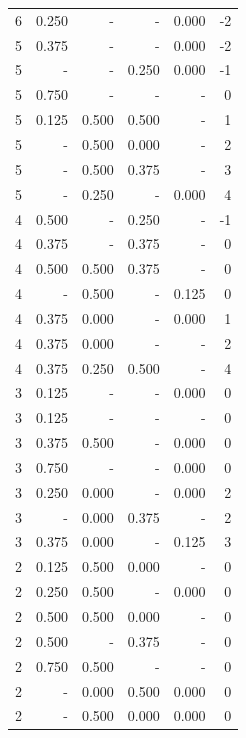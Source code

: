\documentclass[a4paper]{article}\usepackage{graphicx, color}
\begin{document}
\begin{table}[ht]
\begin{tabular}{rrrrrr}
   \rowcolor{nullColor} 6 & 0.250 & - & - & 0.000 & -2 \\ 
   \rowcolor{nullColor} 5 & 0.375 & - & - & 0.000 & -2 \\ 
   \rowcolor{sosoColor} 5 & - & - & 0.250 & 0.000 & -1 \\ 
   \rowcolor{nullColor} 5 & 0.750 & - & - & - & 0 \\ 
   \rowcolor{goodColor} 5 & 0.125 & 0.500 & 0.500 & - & 1 \\ 
   \rowcolor{badColor} 5 & - & 0.500 & 0.000 & - & 2 \\ 
  5 & - & 0.500 & 0.375 & - & 3 \\ 
  5 & - & 0.250 & - & 0.000 & 4 \\ 
   \rowcolor{sosoColor} 4 & 0.500 & - & 0.250 & - & -1 \\ 
   \rowcolor{sosoColor} 4 & 0.375 & - & 0.375 & - & 0 \\ 
  4 & 0.500 & 0.500 & 0.375 & - & 0 \\ 
  4 & - & 0.500 & - & 0.125 & 0 \\ 
  4 & 0.375 & 0.000 & - & 0.000 & 1 \\ 
  4 & 0.375 & 0.000 & - & - & 2 \\ 
   \rowcolor{badColor} 4 & 0.375 & 0.250 & 0.500 & - & 4 \\ 
   \rowcolor{nullColor} 3 & 0.125 & - & - & 0.000 & 0 \\ 
   \rowcolor{nullColor} 3 & 0.125 & - & - & - & 0 \\ 
  3 & 0.375 & 0.500 & - & 0.000 & 0 \\ 
   \rowcolor{nullColor} 3 & 0.750 & - & - & 0.000 & 0 \\ 
  3 & 0.250 & 0.000 & - & 0.000 & 2 \\ 
   \rowcolor{badColor} 3 & - & 0.000 & 0.375 & - & 2 \\ 
  3 & 0.375 & 0.000 & - & 0.125 & 3 \\ 
   \rowcolor{badColor} 2 & 0.125 & 0.500 & 0.000 & - & 0 \\ 
  2 & 0.250 & 0.500 & - & 0.000 & 0 \\ 
   \rowcolor{badColor} 2 & 0.500 & 0.500 & 0.000 & - & 0 \\ 
   \rowcolor{sosoColor} 2 & 0.500 & - & 0.375 & - & 0 \\ 
  2 & 0.750 & 0.500 & - & - & 0 \\ 
   \rowcolor{badColor} 2 & - & 0.000 & 0.500 & 0.000 & 0 \\ 
   \rowcolor{badColor} 2 & - & 0.500 & 0.000 & 0.000 & 0 \\ 

\end{tabular}
\end{table}
\end{document}
